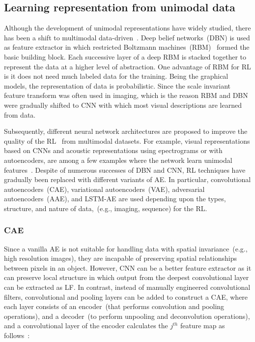 \subsection{Learning representation from unimodal data}
Although the development of unimodal representations have widely studied, there has been a shift to multimodal data-driven~\cite{mmsurvey}. Deep belief networks~(DBN) is used as feature extractor in which restricted Boltzmann machines~(RBM)~\cite{jaitly2011learning} formed the basic building block. Each successive layer of a deep RBM is stacked together to represent the data at a higher level of abstraction. One advantage of RBM for RL is it does not need much labeled data for the training. Being the graphical models, the representation of data is probabilistic. Since the scale invariant feature transform was often used in imaging, which is the reason RBM and DBN were gradually shifted to CNN with which most visual descriptions are learned from data. 

\hspace*{3.5mm} Subsequently, different neural network architectures are proposed to improve the quality of the RL~\cite{min2018survey} from multimodal datasets. For example, visual representations based on CNNs and acoustic representations using epectrograms or with autoencoders, are among a few examples where the network learn unimodal features~\cite{ito2018effects}.
Despite of numerous successes of DBN and CNN, RL techniques have gradually been replaced with different variants of AE. In particular, convolutional autoencoders~(CAE), variational autoencoders~(VAE), adversarial autoencoders~(AAE), and LSTM-AE are used depending upon the types, structure, and nature of data,~(e.g., imaging, sequence) for the RL. 

\subsubsection{CAE}
Since a vanilla AE is not suitable for handling data with spatial invariance~(e.g., high resolution images), they are incapable of preserving spatial relationships between pixels in an object. However, CNN can be a better feature extractor as it can preserve local structure in which output from the deepest convolutional layer can be extracted as LF. In contrast, instead of manually engineered convolutional filters, convolutional and pooling layers can be added to construct a CAE, where each layer consists of an encoder~(that performs convolution and pooling operations), and a decoder~(to perform unpooling and deconvolution operations), and a convolutional layer of the encoder calculates the $j^{th}$ feature map as follows~\cite{alirezaie2019semantic}:

